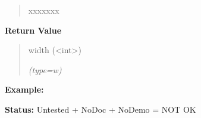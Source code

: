 \begin{boxedminipage}{\funcwidth}
\begin{quote}
\begin{Ventry}{xxxxxxx}
        \end{Ventry}

      \end{quote}

      \textbf{Return Value}
    \vspace{-1ex}

      \begin{quote}
      width ({\textless}int{\textgreater})

      {\it (type=w)}

      \end{quote}

\textbf{Example:} 

\textbf{Status:} Untested + NoDoc + NoDemo = NOT OK



    \end{boxedminipage}

    \label{xformslib:library:fl_get_string_dimension}

    \vspace{0.5ex}

